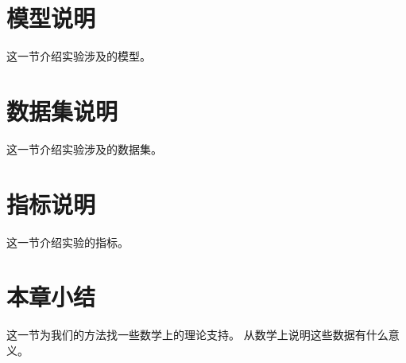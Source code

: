 \section{模型说明}\label{sec:模型说明}
这一节介绍实验涉及的模型。

\section{数据集说明}\label{sec:数据集说明}
这一节介绍实验涉及的数据集。

\section{指标说明}\label{sec:指标说明}
这一节介绍实验的指标。

\section{本章小结}\label{sec:本章小结2}
这一节为我们的方法找一些数学上的理论支持。
从数学上说明这些数据有什么意义。
